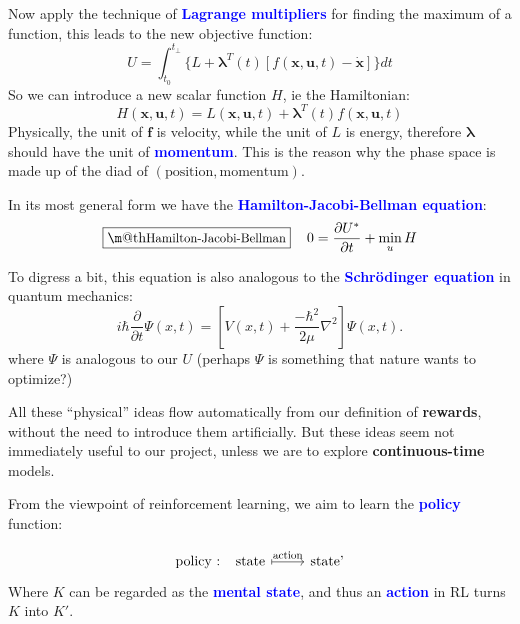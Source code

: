 \documentclass[orivec]{llncs}
\makeatletter
\newcommand{\emp}[1]{\textbf{\textcolor{blue}{#1}}}
\newcommand{\vect}[1]{\boldsymbol{#1}}
\renewcommand{\boxed}[1]{\fbox{\m@th$\displaystyle\scalebox{0.9}{#1}$} \,}
\makeatother
\begin{document}
Now apply the technique of \emp{Lagrange multipliers} for finding the maximum of a function, this leads to the new objective function:
\begin{equation}
U = \int_{t_0}^{t_\bot} \{ L + \vect{\lambda}^T(t) \left[ f(\vect{x}, \vect{u}, t) - \dot{\vect{x}} \right] \} dt
\end{equation}
So we can introduce a new scalar function $H$, ie the Hamiltonian:
\begin{equation}
H(\vect{x}, \vect{u}, t) = L(\vect{x}, \vect{u}, t) + \vect{\lambda}^T(t) f(\vect{x}, \vect{u}, t)
\end{equation}
Physically, the unit of $\vect{f}$ is velocity, while the unit of $L$ is energy, therefore $\vect{\lambda}$ should have the unit of \emp{momentum}.  This is the reason why the phase space is made up of the diad of $(\mbox{position}, \mbox{momentum})$.

In its most general form we have the \emp{Hamilton-Jacobi-Bellman equation}:
\begin{equation}
\boxed{\mbox{Hamilton-Jacobi-Bellman}} \quad
0 = \frac{\partial U^*}{\partial t} + \min_u H
\end{equation}

To digress a bit, this equation is also analogous to the \emp{Schr\"{o}dinger equation} in quantum mechanics:
\begin{equation}
i \hbar \frac{\partial}{\partial t} \Psi(x,t) = \left[ V(x,t) + \frac{-\hbar^2}{2\mu} \nabla^2 \right] \Psi(x,t).
\end{equation}
where $\Psi$ is analogous to our $U$ (perhaps $\Psi$ is something that nature wants to optimize?)

All these ``physical'' ideas flow automatically from our definition of \textbf{rewards}, without the need to introduce them artificially.  But these ideas seem not immediately useful to our project, unless we are to explore \textbf{continuous-time} models.

\iffalse

From the viewpoint of reinforcement learning, we aim to learn the \emp{policy} function: \par
\begin{equation}
\begin{tikzcd}[]
\mbox{policy : ~~state} \arrow[r, mapsto, "\scalebox{0.8}{action}"] & \mbox{state'}
\end{tikzcd}
\end{equation}
Where $K$ can be regarded as the \emp{mental state}, and thus an \emp{action} in RL turns $K$ into $K'$.
\end{document}
